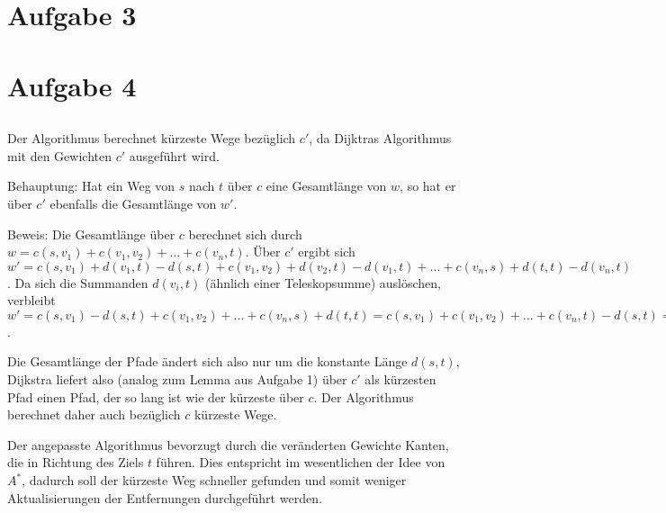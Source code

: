 \documentclass[a4paper]{article}
\begin{document}
\section{Aufgabe 3}

\section{Aufgabe 4}

\subsection{}
Der Algorithmus berechnet kürzeste Wege bezüglich $c'$, da Dijktras
Algorithmus mit den Gewichten $c'$ ausgeführt wird.

Behauptung: Hat ein Weg von $s$ nach $t$ über $c$ eine Gesamtlänge von $w$,
so hat er über $c'$ ebenfalls die Gesamtlänge von $w'$.

Beweis: Die Gesamtlänge über $c$ berechnet sich durch $w = c(s, v_1) +
c(v_1, v_2) + ... + c(v_n, t)$. Über $c'$ ergibt sich $w' = c(s, v_1) +
d(v_1, t) - d(s, t) + c(v_1, v_2) + d(v_2, t) - d(v_1, t) + ... + c(v_n, s)
+ d(t, t) - d(v_n, t)$. Da sich die Summanden $d(v_i, t)$ (ähnlich einer
Teleskopsumme) auslöschen, verbleibt $w' = c(s, v_1) - d(s, t) + c(v_1, v_2)
+ ... + c(v_n, s) + d(t, t) = c(s, v_1) + c(v_1, v_2) + ... + c(v_n, t) -
d(s, t) = w$.

Die Gesamtlänge der Pfade ändert sich also nur um die konstante Länge $d(s,
t)$, Dijkstra liefert also (analog zum Lemma aus Aufgabe 1) über
$c'$ als kürzesten Pfad einen Pfad, der so lang ist wie der kürzeste über
$c$. Der Algorithmus berechnet daher auch bezüglich $c$ kürzeste Wege.

Der angepasste Algorithmus bevorzugt durch die veränderten Gewichte Kanten,
die in Richtung des Ziels $t$ führen. Dies entspricht im wesentlichen der
Idee von $A^*$, dadurch soll der kürzeste Weg schneller gefunden und somit
weniger Aktualisierungen der Entfernungen durchgeführt werden.

\subsection{}
\end{document}
